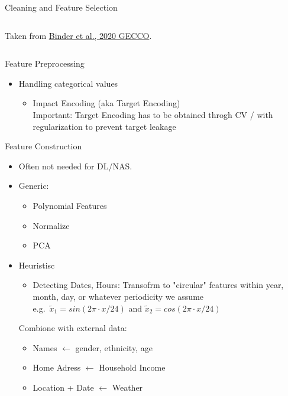 \begin{frame}{Cleaning and Feature Selection}
\begin{columns}
\begin{column}{0.3\textwidth}
\begin{center}
          {\tiny Taken from \href{https://doi.org/10.1145/3377930.3389815}{Binder et al., 2020 GECCO}.}
        \end{center}
      \end{column}
    \end{columns}
\end{frame}

\begin{frame}{Feature Preprocessing}
  \begin{itemize}
    \item Handling categorical values
    \begin{itemize}
      \item Impact Encoding (aka Target Encoding) \\
            Important: Target Encoding has to be obtained throgh CV / with regularization to prevent target leakage
    \end{itemize}
  \end{itemize}
\end{frame}

\begin{frame}{Feature Construction}
  \begin{itemize}
    \item Often not needed for DL/NAS.
    \item Generic:
    \begin{itemize}
      \item Polynomial Features
      \item Normalize 
      \item PCA
    \end{itemize}
    \item Heuristisc
    \begin{itemize}
      \item Detecting Dates, Hours: Transofrm to "circular" features within year, month, day, or whatever periodicity we assume \\
      e.g.\ $\tilde x_1 = sin(2\pi \cdot x /24)$ and $\tilde x_2 = cos(2\pi \cdot x /24)$
    \end{itemize}
    Combione with external data:
    \begin{itemize}
      \item Names $\leftarrow$ gender, ethnicity, age
      \item Home Adress $\leftarrow$ Household Income
      \item Location + Date $\leftarrow$ Weather
    \end{itemize}
  \end{itemize}
    
\end{frame}

